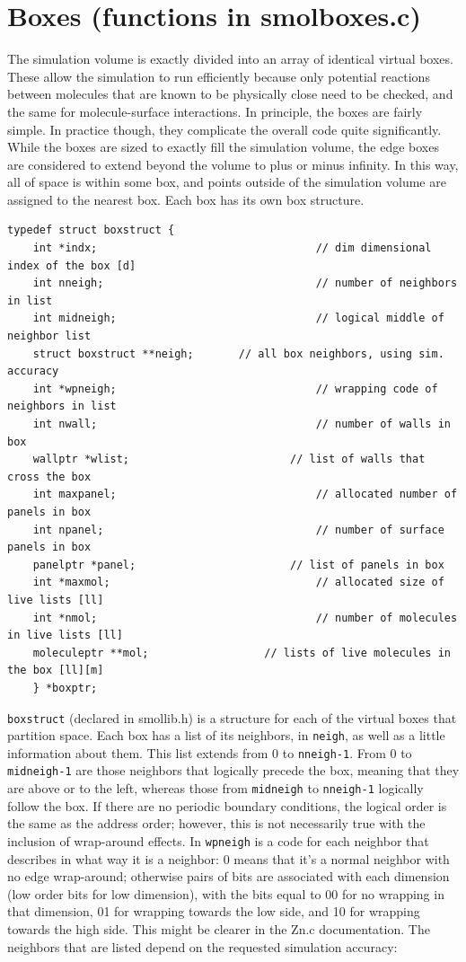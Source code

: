 \documentclass {scrbook}
\newcommand {\ttt} {\texttt}
\begin{document}
\section{Boxes (functions in smolboxes.c)}

The simulation volume is exactly divided into an array of identical virtual boxes. These allow the simulation to run efficiently because only potential reactions between molecules that are known to be physically close need to be checked, and the same for molecule-surface interactions. In principle, the boxes are fairly simple. In practice though, they complicate the overall code quite significantly. While the boxes are sized to exactly fill the simulation volume, the edge boxes are considered to extend beyond the volume to plus or minus infinity. In this way, all of space is within some box, and points outside of the simulation volume are assigned to the nearest box.
Each box has its own box structure.

\begin{lstlisting}
typedef struct boxstruct {
	int *indx;									// dim dimensional index of the box [d]
	int nneigh;									// number of neighbors in list
	int midneigh;								// logical middle of neighbor list
	struct boxstruct **neigh;		// all box neighbors, using sim. accuracy
	int *wpneigh;								// wrapping code of neighbors in list
	int nwall;									// number of walls in box
	wallptr *wlist;							// list of walls that cross the box
	int maxpanel;								// allocated number of panels in box
	int npanel;									// number of surface panels in box
	panelptr *panel;						// list of panels in box
	int *maxmol;								// allocated size of live lists [ll]
	int *nmol;									// number of molecules in live lists [ll]
	moleculeptr **mol;					// lists of live molecules in the box [ll][m]
	} *boxptr;
\end{lstlisting}

\ttt{boxstruct} (declared in smollib.h) is a structure for each of the virtual boxes that partition space. Each box has a list of its neighbors, in \ttt{neigh}, as well as a little information about them. This list extends from 0 to \ttt{nneigh-1}. From 0 to \ttt{midneigh-1} are those neighbors that logically precede the box, meaning that they are above or to the left, whereas those from \ttt{midneigh} to \ttt{nneigh-1} logically follow the box. If there are no periodic boundary conditions, the logical order is the same as the address order; however, this is not necessarily true with the inclusion of wrap-around effects. In \ttt{wpneigh} is a code for each neighbor that describes in what way it is a neighbor: 0 means that it's a normal neighbor with no edge wrap-around; otherwise pairs of bits are associated with each dimension (low order bits for low dimension), with the bits equal to 00 for no wrapping in that dimension, 01 for wrapping towards the low side, and 10 for wrapping towards the high side. This might be clearer in the Zn.c documentation. The neighbors that are listed depend on the requested simulation accuracy:
\end{document}
